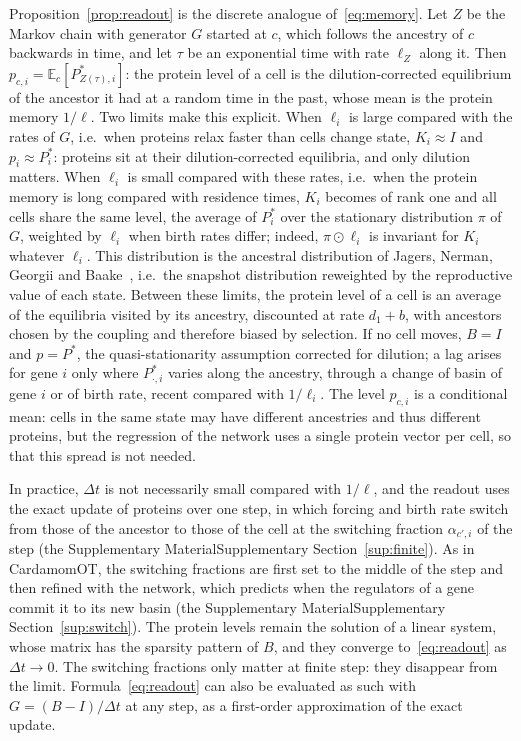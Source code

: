 \documentclass[a4paper, 11pt]{article}
\newcommand{\E}{\mathbb{E}}
\newcommand{\supref}[1]{\ifsimplified the Supplementary Material\else Supplementary Section~\ref{#1}\fi}
\theoremstyle{plain}
\theoremstyle{remark}
\begin{document}
Proposition~\ref{prop:readout} is the discrete analogue of~\eqref{eq:memory}. Let $Z$ be the Markov chain with generator $G$ started at $c$, which follows the ancestry of $c$ backwards in time, and let $\tau$ be an exponential time with rate $\ell_{Z}$ along it. Then $p_{c,i} = \E_c[P^\ast_{Z(\tau),i}]$: the protein level of a cell is the dilution-corrected equilibrium of the ancestor it had at a random time in the past, whose mean is the protein memory $1/\ell$. Two limits make this explicit. When $\ell_i$ is large compared with the rates of $G$, i.e.\ when proteins relax faster than cells change state, $K_i \approx I$ and $p_i \approx P^\ast_i$: proteins sit at their dilution-corrected equilibria, and only dilution matters. When $\ell_i$ is small compared with these rates, i.e.\ when the protein memory is long compared with residence times, $K_i$ becomes of rank one and all cells share the same level, the average of $P^\ast_i$ over the stationary distribution $\pi$ of $G$, weighted by $\ell_i$ when birth rates differ; indeed, $\pi \odot \ell_i$ is invariant for $K_i$ whatever $\ell_i$. This distribution is the ancestral distribution of Jagers, Nerman, Georgii and Baake~\cite{jagers1996asymptotic, georgii2003ancestral}, i.e.\ the snapshot distribution reweighted by the reproductive value of each state. Between these limits, the protein level of a cell is an average of the equilibria visited by its ancestry, discounted at rate $d_1 + b$, with ancestors chosen by the coupling and therefore biased by selection. If no cell moves, $B = I$ and $p = P^\ast$, the quasi-stationarity assumption corrected for dilution; a lag arises for gene $i$ only where $P^\ast_{\cdot,i}$ varies along the ancestry, through a change of basin of gene $i$ or of birth rate, recent compared with $1/\ell_i$. The level $p_{c,i}$ is a conditional mean: cells in the same state may have different ancestries and thus different proteins, but the regression of the network uses a single protein vector per cell, so that this spread is not needed.

In practice, $\Delta t$ is not necessarily small compared with $1/\ell$, and the readout uses the exact update of proteins over one step, in which forcing and birth rate switch from those of the ancestor to those of the cell at the switching fraction $\alpha_{c',i}$ of the step (\supref{sup:finite}). As in CardamomOT, the switching fractions are first set to the middle of the step and then refined with the network, which predicts when the regulators of a gene commit it to its new basin (\supref{sup:switch}). The protein levels remain the solution of a linear system, whose matrix has the sparsity pattern of $B$, and they converge to~\eqref{eq:readout} as $\Delta t \to 0$. The switching fractions only matter at finite step: they disappear from the limit. Formula~\eqref{eq:readout} can also be evaluated as such with $G = (B - I)/\Delta t$ at any step, as a first-order approximation of the exact update.
\end{document}
